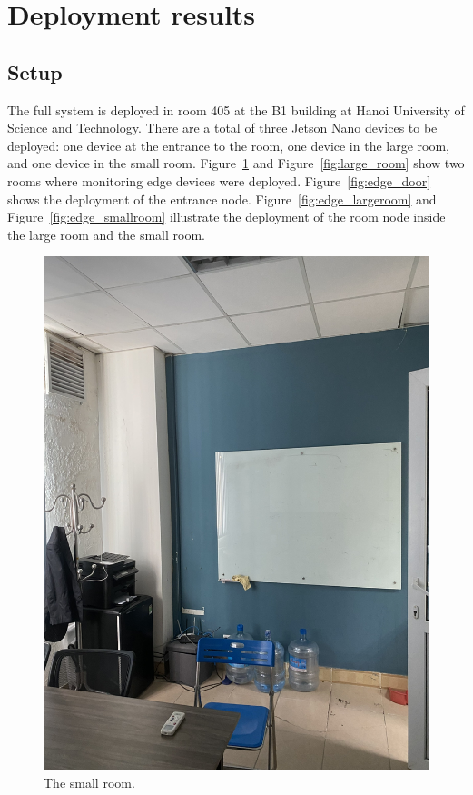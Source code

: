 \documentclass[../main.tex]{subfiles}
\begin{document}
\section{Deployment results}
\subsection{Setup}
The full system is deployed in room 405 at the B1 building at Hanoi University of Science and Technology. There are a total of three Jetson Nano devices to be deployed: one device at the entrance to the room, one device in the large room, and one device in the small room. Figure~\ref{fig:small_room} and Figure~\ref{fig:large_room} show two rooms where monitoring edge devices were deployed. Figure~\ref{fig:edge_door} shows the deployment of the entrance node. Figure~\ref{fig:edge_largeroom} and Figure~\ref{fig:edge_smallroom} illustrate the deployment of the room node inside the large room and the small room.

\begin{figure}[h!]
\centering
\includegraphics[width=0.6\linewidth]{Figure/small_room.jpg}
\caption{The small room.}
\label{fig:small_room}
\end{figure}
\end{document}
